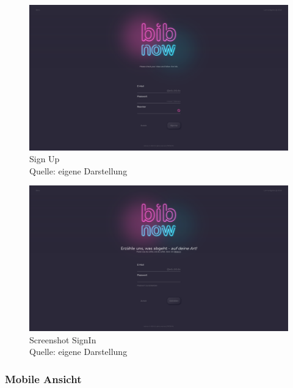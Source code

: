 \documentclass[12pt,titlepage]{article}
\begin{document}
\begin{figure}[hbt!]
\centering
\includegraphics[width=400pt]{screenshots/Screenshot_Desktop2.png}
\caption[Srenshot Sign Up]{Sign Up \\Quelle: eigene Darstellung}
\end{figure}

\begin{figure}[hbt!]
\centering
\includegraphics[width=400pt]{screenshots/Screenshot_Desktop3.png}
\caption[Srenshot Sign In]{Screenshot SignIn \\Quelle: eigene Darstellung}
\end{figure}

\FloatBarrier

\subsubsection{Mobile Ansicht}
\end{document}

